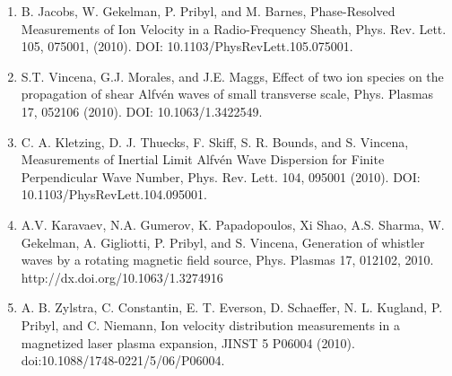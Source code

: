 \documentclass[11pt]{article}
\begin{document}
\begin{enumerate}
\item   B. Jacobs, W. Gekelman, P. Pribyl, and M. Barnes, Phase-Resolved Measurements of Ion Velocity in a Radio-Frequency Sheath, Phys. Rev. Lett. 105, 075001, (2010). DOI: 10.1103/PhysRevLett.105.075001.

\item   S.T. Vincena, G.J. Morales, and J.E. Maggs, Effect of two ion species on the propagation of shear Alfv\'{e}n waves of small transverse scale, Phys. Plasmas 17, 052106 (2010). DOI: 10.1063/1.3422549.

\item   C. A. Kletzing, D. J. Thuecks, F. Skiff, S. R. Bounds, and S. Vincena, Measurements of Inertial Limit Alfv\'{e}n Wave Dispersion for Finite Perpendicular Wave Number, Phys. Rev. Lett. 104, 095001 (2010). DOI: 10.1103/PhysRevLett.104.095001.

\item  A.V. Karavaev, N.A. Gumerov, K. Papadopoulos, Xi Shao, A.S. Sharma, W. Gekelman, A. Gigliotti, P. Pribyl, and S. Vincena, Generation of whistler waves by a rotating magnetic field source, Phys. Plasmas 17, 012102, 2010. http://dx.doi.org/10.1063/1.3274916

\item  A. B. Zylstra, C. Constantin, E. T. Everson, D. Schaeffer, N. L. Kugland, P. Pribyl, and C. Niemann, Ion velocity distribution measurements in a magnetized laser plasma expansion, JINST 5 P06004 (2010). doi:10.1088/1748-0221/5/06/P06004.

\end{enumerate}
	
\end{document}
